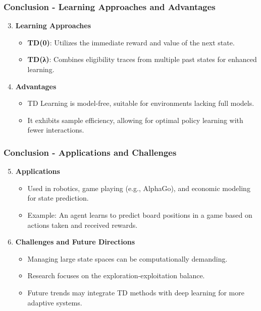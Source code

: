 \documentclass[aspectratio=169]{beamer}
\begin{document}
\begin{frame}[fragile]
    \frametitle{Conclusion - Learning Approaches and Advantages}
    \begin{enumerate}
        \setcounter{enumi}{2}
        \item \textbf{Learning Approaches}
        \begin{itemize}
            \item \textbf{TD(0)}: Utilizes the immediate reward and value of the next state.
            \item \textbf{TD(λ)}: Combines eligibility traces from multiple past states for enhanced learning.
        \end{itemize}
        
        \item \textbf{Advantages}
        \begin{itemize}
            \item TD Learning is model-free, suitable for environments lacking full models.
            \item It exhibits sample efficiency, allowing for optimal policy learning with fewer interactions.
        \end{itemize}
    \end{enumerate}
\end{frame}

\begin{frame}[fragile]
    \frametitle{Conclusion - Applications and Challenges}
    \begin{enumerate}
        \setcounter{enumi}{4}
        \item \textbf{Applications}
        \begin{itemize}
            \item Used in robotics, game playing (e.g., AlphaGo), and economic modeling for state prediction.
            \item Example: An agent learns to predict board positions in a game based on actions taken and received rewards.
        \end{itemize}
        
        \item \textbf{Challenges and Future Directions}
        \begin{itemize}
            \item Managing large state spaces can be computationally demanding.
            \item Research focuses on the exploration-exploitation balance.
            \item Future trends may integrate TD methods with deep learning for more adaptive systems.
        \end{itemize}
    \end{enumerate}
\end{frame}
\end{document}
